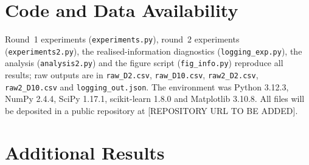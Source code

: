 \documentclass[conference]{IEEEtran}
\begin{document}
\section*{Code and Data Availability}
Round~1 experiments (\texttt{experiments.py}), round~2 experiments (\texttt{experiments2.py}), the realised-information diagnostics (\texttt{logging\_exp.py}), the analysis (\texttt{analysis2.py}) and the figure script (\texttt{fig\_info.py}) reproduce all results; raw outputs are in \texttt{raw\_D2.csv}, \texttt{raw\_D10.csv}, \texttt{raw2\_D2.csv}, \texttt{raw2\_D10.csv} and \texttt{logging\_out.json}. The environment was Python 3.12.3, NumPy 2.4.4, SciPy 1.17.1, scikit-learn 1.8.0 and Matplotlib 3.10.8. All files will be deposited in a public repository at [REPOSITORY URL TO BE ADDED].

\appendices
\section{Additional Results}
\end{document}
